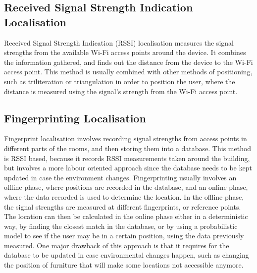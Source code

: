 


\subsection{Received Signal Strength Indication Localisation}
Received Signal Strength Indication (RSSI) localisation measures the signal strengths from the available Wi-Fi access points around the device. It combines the information gathered, and finds out the distance from the device to the Wi-Fi access point. This method is usually combined with other methods of positioning, such as triliteration or triangulation in order to position the user, where the distance is measured using the signal's strength from the Wi-Fi access point.

\subsection{Fingerprinting Localisation}
\label{sec:fingerprinting-localisation}

Fingerprint localisation involves recording signal strengths from access points in different parts of the rooms, and then storing them into a database. This method is  RSSI based, because it records RSSI measurements taken around the building, but involves a more labour oriented approach since the database needs to be kept updated in case the environment changes. Fingerprinting usually involves an offline phase, where positions are recorded in the database, and an online phase, where the data recorded is used to determine the location. In the offline phase, the signal strengths are measured at different fingerprints, or reference points. The location can then be calculated in the online phase  either in a deterministic way, by finding the closest match in the database, or by using a probabilistic model to see if the user may be in a certain position, using the data previously measured. One major drawback of this approach is that it requires for the database to be updated in case environmental changes happen, such as changing the position of furniture that will make some locations not accessible anymore. 

